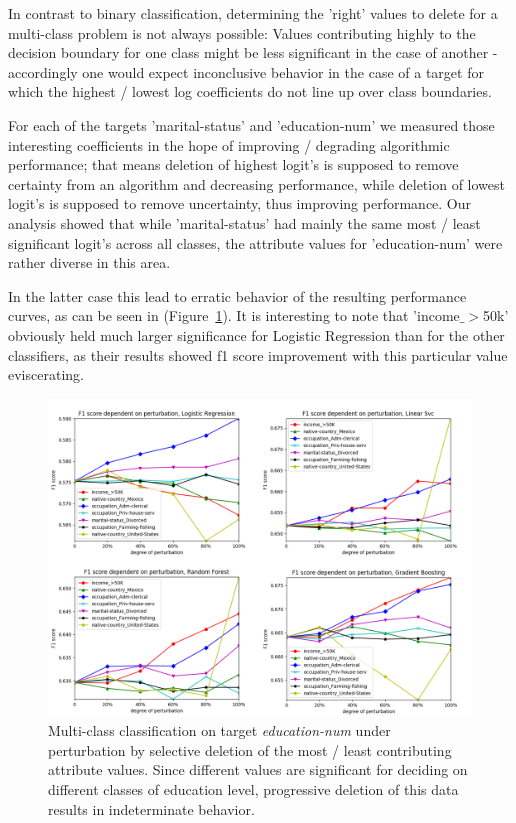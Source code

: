 \documentclass{llncs}
\begin{document}
In contrast to binary classification, determining the 'right' values to delete for a multi-class problem is not always possible: Values contributing highly to the decision boundary for one class might be less significant in the case of another - accordingly one would expect inconclusive behavior in the case of a target for which the highest / lowest log coefficients do not line up over class boundaries.

For each of the targets 'marital-status' and 'education-num' we measured those interesting coefficients in the hope of improving / degrading algorithmic performance; that means deletion of highest logit's is supposed to remove certainty from an algorithm and decreasing performance, while deletion of lowest logit's is supposed to remove uncertainty, thus improving performance. Our analysis showed that while 'marital-status' had mainly the same most / least significant logit's across all classes, the attribute values for 'education-num' were rather diverse in this area.

In the latter case this lead to erratic behavior of the resulting performance curves, as can be seen in (Figure~\ref{fig:results_perturbation_education_num}). It is interesting to note that 'income$\_>$50k' obviously held much larger significance for Logistic Regression than for the other classifiers, as their results showed f1 score improvement with this particular value eviscerating.


\begin{figure}[h]
	\centering
	\includegraphics[width=1\textwidth]{figures/perturbation/adults_education_num/perturb_education_combined}
	\caption{Multi-class classification on target \textit{education-num} under perturbation by selective deletion of the most / least contributing attribute values. Since different values are significant for deciding on different classes of education level, progressive deletion of this data results in indeterminate behavior.}
	\label{fig:results_perturbation_education_num}
\end{figure}
\end{document}
